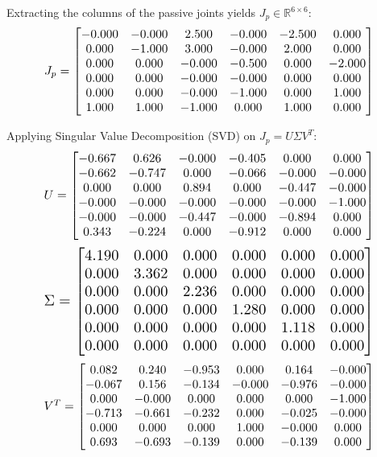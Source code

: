 \documentclass[12pt,a4paper]{article}
\begin{document}
Extracting the columns of the passive joints yields $J_p \in \mathbb{R}^{6 \times 6}$:
\begin{equation}
    \resizebox{0.85\textwidth}{!}{$ J_p = \begin{bmatrix}
  -0.000 & -0.000 & 2.500 & -0.000 & -2.500 & 0.000 \\
  0.000 & -1.000 & 3.000 & -0.000 & 2.000 & 0.000 \\
  0.000 & 0.000 & -0.000 & -0.500 & 0.000 & -2.000 \\
  0.000 & 0.000 & -0.000 & -0.000 & 0.000 & 0.000 \\
  0.000 & 0.000 & -0.000 & -1.000 & 0.000 & 1.000 \\
  1.000 & 1.000 & -1.000 & 0.000 & 1.000 & 0.000
\end{bmatrix} $}
\end{equation}

Applying Singular Value Decomposition (SVD) on $J_p = U \Sigma V^T$:
\begin{equation}
    \resizebox{0.85\textwidth}{!}{$ U = \begin{bmatrix}
  -0.667 & 0.626 & -0.000 & -0.405 & 0.000 & 0.000 \\
  -0.662 & -0.747 & 0.000 & -0.066 & -0.000 & -0.000 \\
  0.000 & 0.000 & 0.894 & 0.000 & -0.447 & -0.000 \\
  -0.000 & -0.000 & -0.000 & -0.000 & -0.000 & -1.000 \\
  -0.000 & -0.000 & -0.447 & -0.000 & -0.894 & 0.000 \\
  0.343 & -0.224 & 0.000 & -0.912 & 0.000 & 0.000
\end{bmatrix} $}
\end{equation}
\begin{equation}
    \resizebox{0.85\textwidth}{!}{$ \Sigma = \begin{bmatrix}
  4.190 & 0.000 & 0.000 & 0.000 & 0.000 & 0.000 \\
  0.000 & 3.362 & 0.000 & 0.000 & 0.000 & 0.000 \\
  0.000 & 0.000 & 2.236 & 0.000 & 0.000 & 0.000 \\
  0.000 & 0.000 & 0.000 & 1.280 & 0.000 & 0.000 \\
  0.000 & 0.000 & 0.000 & 0.000 & 1.118 & 0.000 \\
  0.000 & 0.000 & 0.000 & 0.000 & 0.000 & 0.000
\end{bmatrix} $}
\end{equation}
\begin{equation}
    \resizebox{0.85\textwidth}{!}{$ V^T = \begin{bmatrix}
  0.082 & 0.240 & -0.953 & 0.000 & 0.164 & -0.000 \\
  -0.067 & 0.156 & -0.134 & -0.000 & -0.976 & -0.000 \\
  0.000 & -0.000 & 0.000 & 0.000 & 0.000 & -1.000 \\
  -0.713 & -0.661 & -0.232 & 0.000 & -0.025 & -0.000 \\
  0.000 & 0.000 & 0.000 & 1.000 & -0.000 & 0.000 \\
  0.693 & -0.693 & -0.139 & 0.000 & -0.139 & 0.000
\end{bmatrix} $}
\end{equation}
\end{document}
